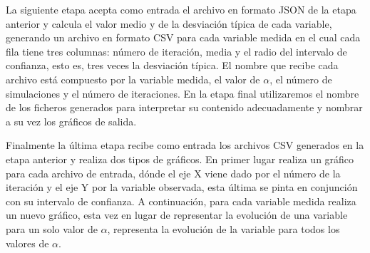 \documentclass[../proyecto.tex]{memoir}
\begin{document}
La siguiente etapa acepta como entrada el archivo en formato JSON de la etapa anterior y calcula el valor medio y de la desviación típica de cada variable, generando un archivo en formato CSV \cite{csv} para cada variable medida en el cual cada fila tiene tres columnas: número de iteración, media y el radio del intervalo de confianza, esto es, tres veces la desviación típica. El nombre que recibe cada archivo está compuesto por la variable medida, el valor de $\alpha$, el número de simulaciones y el número de iteraciones. En la etapa final utilizaremos el nombre de los ficheros generados para interpretar su contenido adecuadamente y nombrar a su vez los gráficos de salida. 

Finalmente la última etapa recibe como entrada los archivos CSV generados en la etapa anterior y realiza dos tipos de gráficos. En primer lugar realiza un gráfico para cada archivo de entrada, dónde el eje X viene dado por el número de la iteración y el eje Y por la variable observada, esta última se pinta en conjunción con su intervalo de confianza. A continuación, para cada variable medida realiza un nuevo gráfico, esta vez en lugar de representar la evolución de una variable para un solo valor de $\alpha$, representa la evolución de la variable para todos los valores de $\alpha$. 
\end{document}
